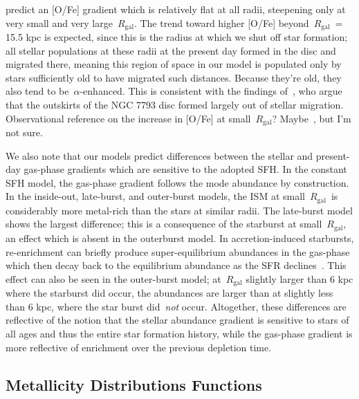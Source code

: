 \documentclass[fleqn, usenatbib]{mnras}
\begin{document}
predict an [O/Fe] gradient which is relatively flat at all radii, steepening 
only at very small and very large~$R_\text{gal}$. The trend toward higher 
[O/Fe] beyond~$R_\text{gal}$~= 15.5 kpc is expected, since this is the radius 
at which we shut off star formation; all stellar populations at these radii at 
the present day formed in the disc and migrated there, meaning this region of 
space in our model is populated only by stars sufficiently old to have migrated 
such distances. Because they're old, they also tend to be~$\alpha$-enhanced. 
This is consistent with the findings of~\citet{RadburnSmith2012}, who argue 
that the outskirts of the NGC 7793 disc formed largely out of stellar 
migration. {\color{red} Observational reference on the increase in [O/Fe] at 
small~$R_\text{gal}$? Maybe~\citet{Hayden2015}, but I'm not sure.} 
\par 
We also note that our models predict differences between the stellar and 
present-day gas-phase gradients which are sensitive to the adopted SFH. In the 
constant SFH model, the gas-phase gradient follows the mode abundance by 
construction. In the inside-out, late-burst, and outer-burst models, the 
ISM at small~$R_\text{gal}$~is considerably more metal-rich than the stars at 
similar radii. The late-burst model shows the largest difference; this is a 
consequence of the starburst at small~$R_\text{gal}$, an effect which is absent 
in the outerburst model. In accretion-induced starbursts, re-enrichment can 
briefly produce super-equilibrium abundances in the gas-phase which then decay 
back to the equilibrium abundance as the SFR declines~\citep{Johnson2020}. This 
effect can also be seen in the outer-burst model; at~$R_\text{gal}$ slightly 
larger than 6 kpc where the starburst did occur, the abundances are larger than 
at slightly less than 6 kpc, where the star burst did~\textit{not} occur. 
Altogether, these differences are reflective of the notion that the stellar 
abundance gradient is sensitive to stars of all ages and thus the entire star 
formation history, while the gas-phase gradient is more reflective of 
enrichment over the previous depletion time. 

\subsection{Metallicity Distributions Functions} 
\label{sec:obs_comp:mdfs} 
\end{document}
